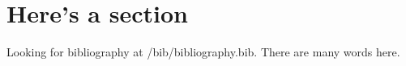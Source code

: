 \documentclass[../../main.tex]{subfiles}
\begin{document}
\section{Here's a section}
Looking for bibliography at \rootdir/bib/bibliography.bib.
There are many words here\autocite{Zimmermann1991}.

\printbibliography
\end{document}
